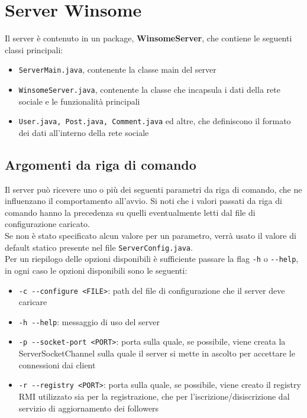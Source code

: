 \section{Server Winsome}
Il server è contenuto in un package, \textbf{WinsomeServer}, che contiene le seguenti classi principali:
\begin{itemize}
	\item \verb|ServerMain.java|, contenente la classe main del server
	\item \verb|WinsomeServer.java|, contenente la classe che incapsula i dati della rete 
	sociale e le funzionalità principali
	\item \verb|User.java, Post.java, Comment.java| ed altre, che definiscono il formato dei dati
	all'interno della rete sociale
\end{itemize}

\subsection{Argomenti da riga di comando}
Il server può ricevere uno o più dei seguenti parametri da riga di comando, che ne influenzano il comportamento all'avvio.
Si noti che i valori passati da riga di comando hanno la precedenza su quelli eventualmente letti dal file di configurazione caricato.\\
Se non è stato specificato alcun valore per un parametro, verrà usato il valore di default statico presente nel file \verb|ServerConfig.java|.\\
Per un riepilogo delle opzioni disponibili è sufficiente passare la flag \verb|-h| o \verb|--help|, in ogni caso le opzioni
disponibili sono le seguenti:

\begin{itemize}
	\item \verb|-c --configure <FILE>|: path del file di configurazione che il server deve caricare
	\item \verb|-h --help|: messaggio di uso del server
	\item \verb|-p --socket-port <PORT>|: porta sulla quale, se possibile, viene creata la ServerSocketChannel 
	sulla quale il server si mette in ascolto per accettare le connessioni dai client
	\item \verb|-r --registry <PORT>|: porta sulla quale, se possibile, viene creato il registry 
	RMI utilizzato sia per la registrazione, che per l'iscrizione/disiscrizione dal servizio di aggiornamento dei followers
\end{itemize}


